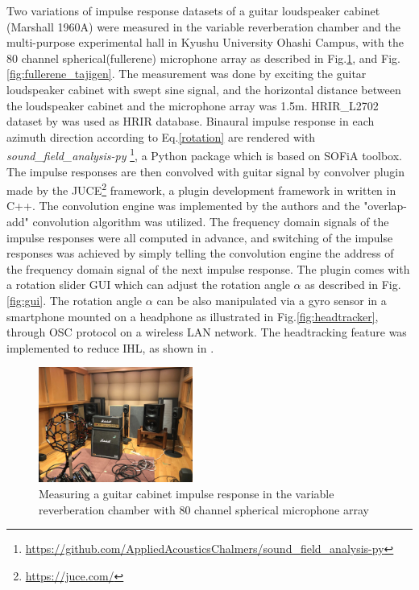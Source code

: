 \documentclass[convention,e-brief]{aesconf-current}
\begin{document}
Two variations of impulse response datasets of a guitar loudspeaker cabinet (Marshall 1960A) were measured in the variable reverberation chamber and the multi-purpose experimental hall in Kyushu University Ohashi Campus, with the 80 channel spherical(fullerene) microphone array\cite{Omoto2015-wq} as described in Fig.\ref{fig:fullerene_zanka}, and Fig.\ref{fig:fullerene_tajigen}.
The measurement was done by exciting the guitar loudspeaker cabinet with swept sine signal, and the horizontal distance between the loudspeaker cabinet and the microphone array was 1.5m.
HRIR\_L2702 dataset by \citet{Bernschutz2013-zy} was used as HRIR database.
Binaural impulse response in each azimuth direction according to Eq.\ref{rotation} are rendered with \emph{sound\_field\_analysis-py} \footnote{\url{https://github.com/AppliedAcousticsChalmers/sound_field_analysis-py}}, a Python package which is based on SOFiA toolbox\cite{Bernschutz2011-rj}.
The impulse responses are then convolved with guitar signal by convolver plugin made by the JUCE\footnote{\url{https://juce.com/}} framework, a plugin development framework in written in C++.
The convolution engine was implemented by the authors and the "overlap-add" convolution algorithm was utilized.
The frequency domain signals of the impulse responses were all computed in advance, and switching of the impulse responses was achieved by simply telling the convolution engine the address of the frequency domain signal of the next impulse response.
The plugin comes with a rotation slider GUI which can adjust the rotation angle $\alpha$ as described in Fig.\ref{fig:gui}. The rotation angle $\alpha$ can be also manipulated via a gyro sensor in a smartphone mounted on a headphone as illustrated in Fig.\ref{fig:headtracker}, through OSC\cite{osc2002} protocol on a wireless LAN network. The headtracking feature was implemented to reduce IHL, as shown in \cite{roginska2017immersive}.

\begin{figure}
    \centering
    \includegraphics[width=0.45\textwidth]{./fig/fullerene_zanka.jpg}
    \caption{Measuring a guitar cabinet impulse response in the variable reverberation chamber with 80 channel spherical microphone array}
    \label{fig:fullerene_zanka}
\end{figure}
\end{document}
